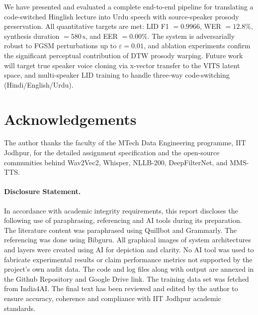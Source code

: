 \documentclass[10pt,twocolumn]{article}
\begin{document}
We have presented and evaluated a complete end-to-end pipeline for translating a code-switched Hinglish lecture into Urdu speech with source-speaker prosody preservation. All quantitative targets are met: LID F1 $= 0.9966$, WER $= 12.8\%$, synthesis duration $= 580\,\text{s}$, and EER $= 0.00\%$. The system is adversarially robust to FGSM perturbations up to $\varepsilon = 0.01$, and ablation experiments confirm the significant perceptual contribution of DTW prosody warping. Future work will target true speaker voice cloning via x-vector transfer to the VITS latent space, and multi-speaker LID training to handle three-way code-switching (Hindi/English/Urdu).

\section*{Acknowledgements}
The author thanks the faculty of the MTech Data Engineering programme, IIT Jodhpur, for the detailed assignment specification and the open-source communities behind Wav2Vec2, Whisper, NLLB-200, DeepFilterNet, and MMS-TTS.

\paragraph{Disclosure Statement.}
In accordance with academic integrity requirements, this report discloses the following use of paraphrasing, referencing and AI tools during its preparation. The literature content was paraphrased using Quillbot and Grammarly. The referencing was done using Bibguru. All graphical images of system architectures and layers were created using AI for depiction and clarity.  No AI tool was used to fabricate experimental results or claim performance metrics not supported by the project's own audit data. The code and log files along with output are annexed in the Github Repository and Google Drive link. The training  data set was fetched from India4AI. The final text has been reviewed and edited by the author to ensure accuracy, coherence and compliance with IIT Jodhpur academic standards.
\end{document}
